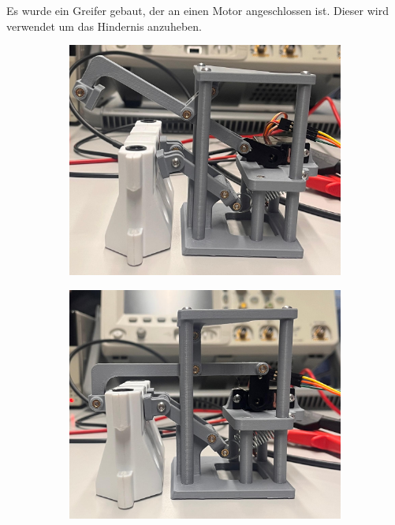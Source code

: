 Es wurde ein Greifer gebaut, der an einen Motor angeschlossen ist. Dieser wird verwendet um das Hindernis anzuheben.

\begin{figure}[H]
\centering
\begin{subfigure}{0.32\textwidth}
\includegraphics[width=0.95\linewidth]{assets/greifer-prototyp/Bild_Greifer_2_offen.jpeg} 
\end{subfigure}
\begin{subfigure}{0.32\textwidth}
\includegraphics[width=0.95\linewidth]{assets/greifer-prototyp/Bild_Greifer_2_klemmen.jpeg} 
\end{subfigure}

\end{figure}

